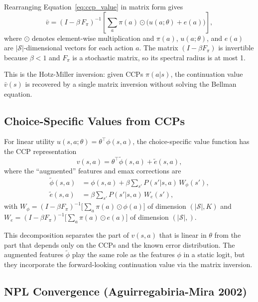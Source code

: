 \documentclass[11pt]{article}
\begin{document}
Rearranging Equation~\eqref{eq:ccp_value} in matrix form gives
\begin{equation}
\label{eq:ccp_matrix}
\bar{v} = (I - \beta\, F_\pi)^{-1} \left[\sum_a \pi(a) \odot \bigl(u(a;\theta) + e(a)\bigr)\right],
\end{equation}
where $\odot$ denotes element-wise multiplication and $\pi(a)$, $u(a;\theta)$, and $e(a)$ are $|\mathcal{S}|$-dimensional vectors for each action $a$. The matrix $(I - \beta F_\pi)$ is invertible because $\beta < 1$ and $F_\pi$ is a stochastic matrix, so its spectral radius is at most 1.

This is the Hotz-Miller inversion: given CCPs $\pi(a|s)$, the continuation value $\bar{v}(s)$ is recovered by a single matrix inversion without solving the Bellman equation.

\subsection{Choice-Specific Values from CCPs}

For linear utility $u(s,a;\theta) = \theta^\top \phi(s,a)$, the choice-specific value function has the CCP representation
\begin{equation}
\label{eq:csv_decomp}
v(s,a) = \theta^\top \tilde{\phi}(s,a) + \tilde{e}(s,a),
\end{equation}
where the ``augmented'' features and emax corrections are
\begin{align}
\tilde{\phi}(s,a) &= \phi(s,a) + \beta \sum_{s'} P(s'|s,a)\, W_\phi(s'), \label{eq:aug_features} \\
\tilde{e}(s,a) &= \beta \sum_{s'} P(s'|s,a)\, W_e(s'), \label{eq:aug_emax}
\end{align}
with $W_\phi = (I - \beta F_\pi)^{-1} \bigl[\sum_a \pi(a) \odot \phi(a)\bigr]$ of dimension $(|\mathcal{S}|, K)$ and $W_e = (I - \beta F_\pi)^{-1} \bigl[\sum_a \pi(a) \odot e(a)\bigr]$ of dimension $(|\mathcal{S}|,)$.

This decomposition separates the part of $v(s,a)$ that is linear in $\theta$ from the part that depends only on the CCPs and the known error distribution. The augmented features $\tilde{\phi}$ play the same role as the features $\phi$ in a static logit, but they incorporate the forward-looking continuation value via the matrix inversion.

\subsection{NPL Convergence (Aguirregabiria-Mira 2002)}
\end{document}
